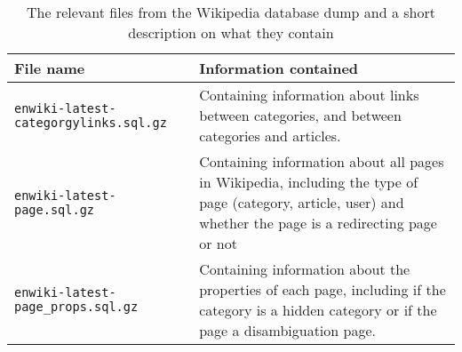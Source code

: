 



\begin{table}[ht]
\renewcommand{\arraystretch}{1.25}
\begin{tabularx}{\textwidth}{l|X}
\textbf{File name} & \textbf{Information contained}\\ \hline
\texttt{enwiki-latest-categorgylinks.sql.gz} &  Containing information about links between categories, and between categories and articles. \\ \hline
\texttt{enwiki-latest-page.sql.gz} & Containing information about all pages in Wikipedia, including the type of page (category, article, user) and whether the page is a redirecting page or not\\ \hline
\texttt{enwiki-latest-page\_props.sql.gz} & Containing information about the properties of each page, including if the category is a hidden category or if the page a disambiguation page.
\end{tabularx}
\\[10pt]
\caption[Relevant files from Wikipedia database dump]{The relevant files from the Wikipedia database dump and a short description on what they contain}
\label{tab:databasedumpfiles}
\end{table}
